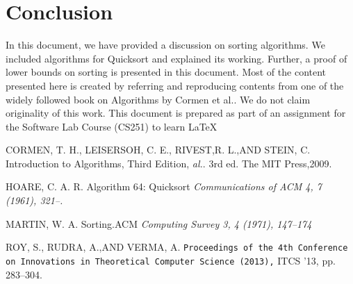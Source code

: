 \documentclass[a4paper, 10pt,twocolumn]{article}
\begin{document}
\section{Conclusion}
In this document, we have provided a discussion
on sorting algorithms. We included algorithms for
Quicksort and explained its working. Further, a
proof of lower bounds on sorting is presented in this
document. Most of the content presented here is
created by referring and reproducing contents from
one of the widely followed book on Algorithms by
Cormen et al.\cite{first}. We do not claim originality of
this work. This document is prepared as part of an
assignment for the Software Lab Course (CS251) to
learn \LaTeX{}



\begin{thebibliography}{9}
CORMEN, T. H., LEISERSOH, C. E., RIVEST,R. L.,AND STEIN, C. Introduction to Algorithms, Third Edition,
\textit{al.}.
3rd ed. The MIT Press,2009.

HOARE, C. A. R. Algorithm 64: Quicksort
\textit{Communications of ACM 4, 7 (1961), 321–.}
\textit{}


MARTIN, W. A. Sorting.ACM
\textit{Computing Survey 3, 4 (1971), 147–174}
\textit{}


ROY, S., RUDRA, A.,AND VERMA, A.
\texttt{Proceedings of the 4th Conference on Innovations in Theoretical Computer Science (2013),}
ITCS ’13, pp. 283–304.
\end{thebibliography}
\end{document}

